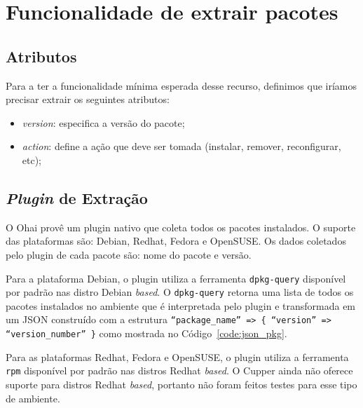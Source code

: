\section{Funcionalidade de extrair pacotes}
\label{sec:pacotes}

\subsection{Atributos}
Para a ter a funcionalidade mínima esperada desse recurso, definimos que iríamos
precisar extrair os seguintes atributos:

\begin{itemize}
  \item \textit{version}: especifica a versão do pacote;
  \item \textit{action}: define a ação que deve ser tomada
    (instalar, remover, reconfigurar, etc);
\end{itemize}

\subsection{\textit{Plugin} de Extração}

O Ohai provê um plugin nativo que coleta todos os pacotes instalados. O suporte
das plataformas são: Debian, Redhat, Fedora e OpenSUSE\@. Os dados coletados pelo
plugin de cada pacote são: nome do pacote e versão.

Para a plataforma Debian, o plugin utiliza a ferramenta \texttt{dpkg-query} disponível
por padrão nas distro Debian \textit{based}. O \texttt{dpkg-query} retorna uma lista de todos os pacotes
instalados no ambiente que é interpretada pelo plugin e transformada em um JSON
construído com a estrutura \texttt{``package\_name'' => \{ ``version'' => ``version\_number'' \}}
como mostrada no Código~\ref{code:json_pkg}.

\noindent\begin{minipage}{\textwidth}
  \lstset{style=shell}
  
\end{minipage}\hfill

Para as plataformas Redhat, Fedora e OpenSUSE, o plugin utiliza a ferramenta \texttt{rpm}
disponível por padrão nas distros Redhat \textit{based}. O Cupper ainda não oferece suporte
para distros Redhat \textit{based}, portanto não foram feitos testes para esse tipo de ambiente.

